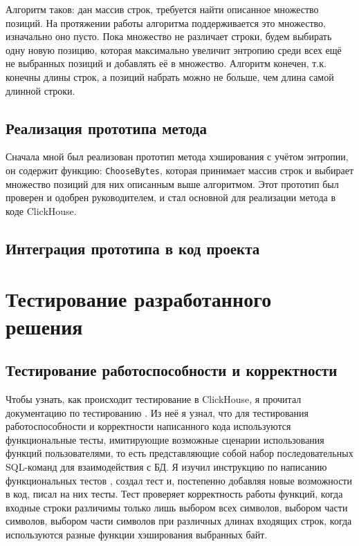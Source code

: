 \documentclass[a4paper,12pt]{extarticle}
\begin{document}
Алгоритм таков: дан массив строк, требуется найти описанное множество позиций. На протяжении работы алгоритма поддерживается это множество, изначально оно пусто. Пока множество не различает строки, будем выбирать одну новую позицию, которая максимально увеличит энтропию среди всех ещё не выбранных позиций и добавлять её в множество. Алгоритм конечен, т.к. конечны длины строк, а позиций набрать можно не больше, чем длина самой длинной строки. 

\subsection{Реализация прототипа метода}

Сначала мной был реализован прототип метода хэширования с учётом энтропии, он содержит функцию: \texttt{ChooseBytes}, которая принимает массив строк и выбирает множество позиций для них описанным выше алгоритмом. Этот прототип был проверен и одобрен руководителем, и стал основной для реализации метода в коде ClickHouse.

\subsection{Интеграция прототипа в код проекта}



\newpage

\section{Тестирование разработанного решения}
\subsection{Тестирование работоспособности и корректности}
Чтобы узнать, как происходит тестирование в ClickHouse, я прочитал документацию по тестированию \cite{clickhouse_testing}. Из неё я узнал, что для тестирования работоспособности и корректности написанного кода используются функциональные тесты, имитирующие возможные сценарии использования функций пользователями, то есть представляющие собой набор последовательных SQL-команд для взаимодействия с БД. Я изучил инструкцию по написанию функциональных тестов \cite{clickhouse_sql_test_queries}, создал тест и, постепенно добавляя новые возможности в код, писал на них тесты. Тест проверяет корректность работы функций, когда входные строки различимы только лишь выбором всех символов, выбором части символов, выбором части символов при различных длинах входящих строк, когда используются разные функции хэширования выбранных байт.
\end{document}
